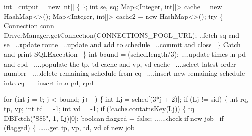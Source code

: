 \documentclass{article}
\def\nwendcode{\endtrivlist \endgroup}      %
\let\nwdocspar=\par
\theoremstyle{definition}                   %
\begin{document}
  int[] output = new int[] \{ \};
  int se, sq;
  Map<Integer, int[]> cache = new HashMap<>();
  Map<Integer, int[]> cache2 = new HashMap<>();
  try \{
    Connection conn = DriverManager.getConnection(CONNECTIONS_POOL_URL);
    \LA{}..fetch \code{}sq\edoc{} and \code{}se\edoc{}~{\nwtagstyle{}}\RA{}
    \LA{}..update route~{\nwtagstyle{}}\RA{}
    \LA{}..update and add to schedule~{\nwtagstyle{}}\RA{}
    \LA{}..commit and close~{\nwtagstyle{}}\RA{}
  \}
  \LA{}Catch and print \code{}SQLException\edoc{}~{\nwtagstyle{}}\RA{}
\}
\eatline
{}\nwendcode{}\endmoddef{}
int bound = (sched.length/3);
\LA{}....update times in pd and cpd~{\nwtagstyle{}}\RA{}
\LA{}....populate the tp, td cache and vp, vd cache~{\nwtagstyle{}}\RA{}
\LA{}....select latest order number~{\nwtagstyle{}}\RA{}
\LA{}....delete remaining schedule from cq~{\nwtagstyle{}}\RA{}
\LA{}....insert new remaining schedule into cq~{\nwtagstyle{}}\RA{}
\LA{}....insert into pd, cpd~{\nwtagstyle{}}\RA{}
\nwendcode{}\nwdocspar
\nwenddocs{}\endmoddef{}
for (int j = 0; j < bound; j++) \{
  int Lj = sched[(3*j + 2)];
  if (Lj != sid) \{
    int rq, tp, vp;
    int td = -1;
    int vd = -1;
    if (!cache.containsKey(Lj)) \{
      rq = DBFetch("S85", 1, Lj)[0];
      boolean flagged = false;
      \LA{}......check if new job~{\nwtagstyle{}}\RA{}
      if (flagged) \{
        \LA{}......get tp, vp, td, vd of new job~{\nwtagstyle{}}\RA{}
\end{document}
